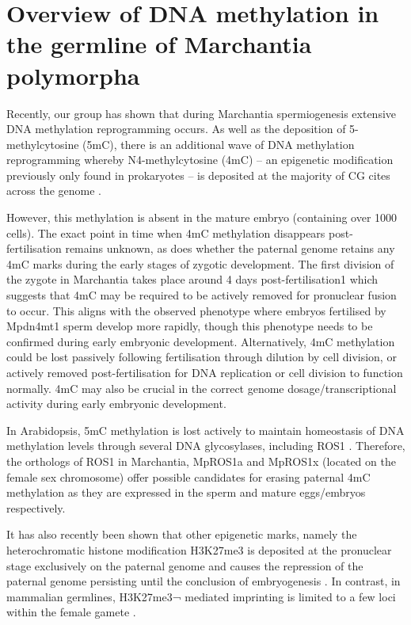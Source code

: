 \section{Overview of DNA methylation in the germline of Marchantia polymorpha}

Recently, our group has shown that during Marchantia spermiogenesis extensive DNA methylation reprogramming occurs. As well as the deposition of 5-methylcytosine (5mC), there is an additional wave of DNA methylation reprogramming whereby N4-methylcytosine (4mC) – an epigenetic modification previously only found in prokaryotes – is deposited at the majority of CG cites across the genome \citep{RN189}.

However, this methylation is absent in the mature embryo (containing over 1000 cells). The exact point in time when 4mC methylation disappears post-fertilisation remains unknown, as does whether the paternal genome retains any 4mC marks during the early stages of zygotic development. The first division of the zygote in Marchantia takes place around 4 days post-fertilisation1 which suggests that 4mC may be required to be actively removed for pronuclear fusion to occur. This aligns with the observed phenotype where embryos fertilised by Mpdn4mt1 sperm develop more rapidly, though this phenotype needs to be confirmed during early embryonic development. Alternatively, 4mC methylation could be lost passively following fertilisation through dilution by cell division, or actively removed post-fertilisation for DNA replication or cell division to function normally. 4mC may also be crucial in the correct genome dosage/transcriptional activity during early embryonic development. 

In Arabidopsis, 5mC methylation is lost actively to maintain homeostasis of DNA methylation levels through several DNA glycosylases, including ROS1 \citep{RN168}. Therefore, the orthologs of ROS1 in Marchantia, MpROS1a and MpROS1x (located on the female sex chromosome) offer possible candidates for erasing paternal 4mC methylation as they are expressed in the sperm \citep{RN212} and mature eggs/embryos \citep{RN257} respectively.

It has also recently been shown that other epigenetic marks, namely the heterochromatic histone modification H3K27me3 is deposited at the pronuclear stage exclusively on the paternal genome and causes the repression of the paternal genome persisting until the conclusion of embryogenesis \citep{RN160}. In contrast, in mammalian germlines, H3K27me3¬ mediated imprinting is limited to a few loci within the female gamete \citep{RN172}.


